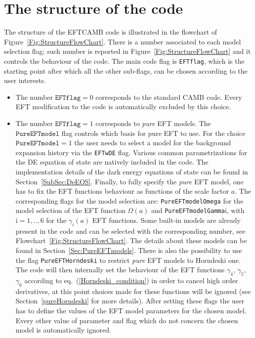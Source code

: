 \documentclass[prd,nofootinbib,showpacs]{revtex4}
\begin{document}
{\section{The structure of the code}\label{Sec:Code structure}
%
The structure of the EFTCAMB code is illustrated in the flowchart of Figure~\ref{Fig:StructureFlowChart}. There is a number associated to each model selection flag; such number is reported in Figure~\ref{Fig:StructureFlowChart} and it controls the behaviour of the code.
The main code flag is \texttt{EFTflag}, which is the starting point after which all the other sub-flags, can be chosen according to the user interests.
%
\begin{itemize}
\item The number $\texttt{EFTflag}=0$ corresponds to the standard CAMB code. Every EFT modification to the code is automatically excluded by this choice.
%
\item  The number $\texttt{EFTflag}=1$ corresponds to \textit{pure} EFT models. 
The $\texttt{PureEFTmodel}$ flag controls which basis for pure EFT to use.
For the choice $\texttt{PureEFTmodel}=1$ the user needs to select a model for the background expansion history via the \texttt{EFTwDE} flag. Various common parametrizations for the DE equation of state are natively included in the code.
The implementation details of the dark energy equations of state can be found in Section~\ref{SubSec:DeEOS}.
Finally, to fully specify the {\it pure} EFT model, one has to fix the EFT functions behaviour as functions of the scale factor $a$. The corresponding flags for the model selection are: \texttt{PureEFTmodelOmega} for the model selection of the EFT function $\Omega(a)$ and \texttt{PureEFTmodelGamma}$\text{i}$, with $\text{i}=1,..,6$ for the $\gamma_i(a)$ EFT functions. Some built-in models are already present in the code and can be selected with the corresponding number, see Flowchart~\ref{Fig:StructureFlowChart}. The details about these models can be found in Section~\ref{Sec:PureEFTmodels}.
There is also the possibility to use the flag \texttt{PureEFTHorndeski} to restrict \textit{pure} EFT models to Horndeski one.  
The code will then internally set the behaviour of the EFT functions $\gamma_4$, $\gamma_5$, $\gamma_6$ according to eq.~(\ref{Horndeski_condition}) in order to cancel high order derivatives, at this point choices made for these functions will be ignored (see Section~\ref{pureHorndeski} for more details).
After setting these flags the user has to define the values of the EFT model parameters for the chosen model. Every other value of parameter and flag which do not concern the chosen model is automatically ignored.

\end{itemize}}
\end{document}
